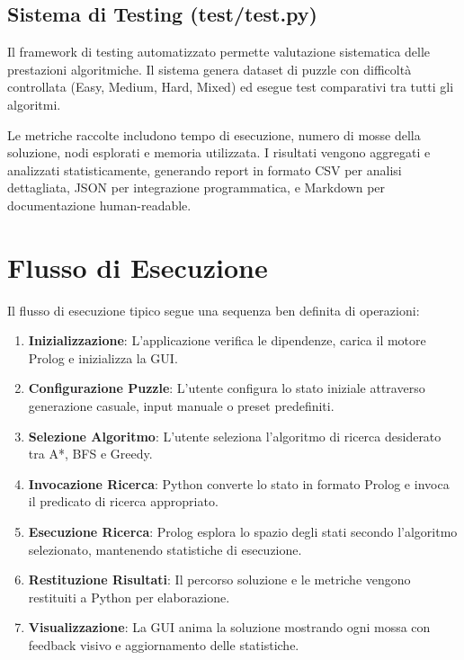 \documentclass[12pt,a4paper]{report}
\theoremstyle{definition}
\begin{document}
\subsection{Sistema di Testing (test/test.py)}

Il framework di testing automatizzato permette valutazione sistematica delle prestazioni algoritmiche. Il sistema genera dataset di puzzle con difficoltà controllata (Easy, Medium, Hard, Mixed) ed esegue test comparativi tra tutti gli algoritmi.

Le metriche raccolte includono tempo di esecuzione, numero di mosse della soluzione, nodi esplorati e memoria utilizzata. I risultati vengono aggregati e analizzati statisticamente, generando report in formato CSV per analisi dettagliata, JSON per integrazione programmatica, e Markdown per documentazione human-readable.

\section{Flusso di Esecuzione}

Il flusso di esecuzione tipico segue una sequenza ben definita di operazioni:

\begin{enumerate}
    \item \textbf{Inizializzazione}: L'applicazione verifica le dipendenze, carica il motore Prolog e inizializza la GUI.
    
    \item \textbf{Configurazione Puzzle}: L'utente configura lo stato iniziale attraverso generazione casuale, input manuale o preset predefiniti.
    
    \item \textbf{Selezione Algoritmo}: L'utente seleziona l'algoritmo di ricerca desiderato tra A*, BFS e Greedy.
    
    \item \textbf{Invocazione Ricerca}: Python converte lo stato in formato Prolog e invoca il predicato di ricerca appropriato.
    
    \item \textbf{Esecuzione Ricerca}: Prolog esplora lo spazio degli stati secondo l'algoritmo selezionato, mantenendo statistiche di esecuzione.
    
    \item \textbf{Restituzione Risultati}: Il percorso soluzione e le metriche vengono restituiti a Python per elaborazione.
    
    \item \textbf{Visualizzazione}: La GUI anima la soluzione mostrando ogni mossa con feedback visivo e aggiornamento delle statistiche.
\end{enumerate}
\end{document}
